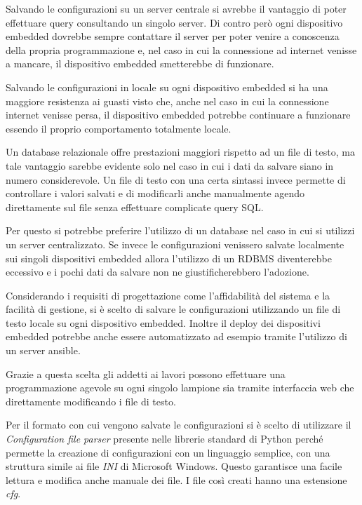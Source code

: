 Salvando le configurazioni su un server centrale si avrebbe il vantaggio di poter effettuare query consultando un singolo server.
Di contro però ogni dispositivo embedded dovrebbe sempre contattare il server per poter venire a conoscenza della propria programmazione e, nel caso in cui la connessione ad internet venisse a mancare, il dispositivo embedded smetterebbe di funzionare.

Salvando le configurazioni in locale su ogni dispositivo embedded si ha una maggiore resistenza ai guasti visto che, anche nel caso in cui la connessione internet venisse persa, il dispositivo embedded potrebbe continuare a funzionare essendo il proprio comportamento totalmente locale.

Un database relazionale offre prestazioni maggiori rispetto ad un file di testo, ma tale vantaggio sarebbe evidente solo nel caso in cui i dati da salvare siano in numero considerevole.
Un file di testo con una certa sintassi invece permette di controllare i valori salvati e di modificarli anche manualmente agendo direttamente sul file senza effettuare complicate query SQL.

Per questo si potrebbe preferire l'utilizzo di un database nel caso in cui si utilizzi un server centralizzato.
Se invece le configurazioni venissero salvate localmente sui singoli dispositivi embedded allora l'utilizzo di un RDBMS diventerebbe eccessivo e i pochi dati da salvare non ne giustificherebbero l'adozione.

Considerando i requisiti di progettazione come l'affidabilità del sistema e la facilità di gestione, si è scelto di salvare le configurazioni utilizzando un file di testo locale su ogni dispositivo embedded.
Inoltre il deploy dei dispositivi embedded potrebbe anche essere automatizzato ad esempio tramite l'utilizzo di un server ansible.

Grazie a questa scelta gli addetti ai lavori possono effettuare una programmazione agevole su ogni singolo lampione sia tramite interfaccia web che direttamente modificando i file di testo.

Per il formato con cui vengono salvate le configurazioni si è scelto di utilizzare il \textit{Configuration file parser} presente nelle librerie standard di Python perché permette la creazione di configurazioni con un linguaggio semplice, con una struttura simile ai file \textit{INI} di Microsoft Windows.
Questo garantisce una facile lettura e modifica anche manuale dei file.
I file così creati hanno una estensione \textit{cfg}.

